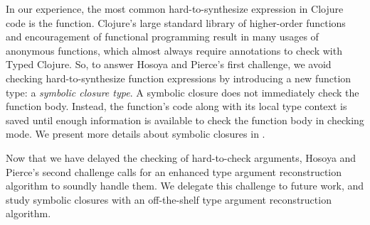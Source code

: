 In our experience, the most common hard-to-synthesize expression in Clojure code
is the function.
Clojure's large standard library of higher-order functions and encouragement
of functional programming result in many usages of anonymous functions, which almost
always require annotations to check with Typed Clojure.
So, to answer Hosoya and Pierce's first challenge, 
we avoid checking hard-to-synthesize function expressions by
introducing a new function type: a \emph{symbolic closure type}.
A symbolic closure does not immediately check the function body. Instead,
the function's code along with its local type context is saved
until enough information is available to check
the function body in checking mode.
We present more details about symbolic closures in .

Now that we have delayed the checking of hard-to-check arguments,
Hosoya and Pierce's second challenge calls for an enhanced
type argument reconstruction algorithm to soundly handle
them.
We delegate this challenge to future work, and study symbolic closures
with an off-the-shelf
type argument reconstruction algorithm.

%


